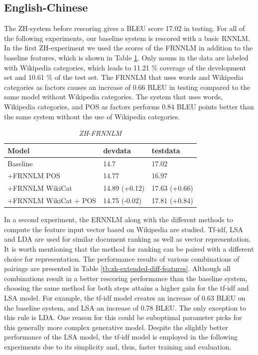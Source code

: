 \documentclass[a4paper]{article}
\begin{document}
\subsection{English-Chinese}
The ZH-system before rescoring gives a BLEU score 17.02 in testing. For all of the following experiments, our baseline system is rescored with a basic RNNLM.
In the first ZH-experiment we used the scores of the FRNNLM in addition to the baseline features, which is shown in Table \ref{tb:zh-factored}. Only nouns in the data are labeled with Wikipedia categories, which leads to 11.21 \% coverage of the development set and 10.61 \% of the test set. The FRNNLM that uses words and Wikipedia categories as factors causes an increase of 0.66 BLEU in testing compared to the same model without Wikipedia categories. The system that uses words, Wikipedia categories, and POS as factors performs 0.84 BLEU points better than the same system without the use of Wikipedia categories.

\begin{table}
\caption{\it ZH-FRNNLM}
\vspace{2mm}
\centering
  \begin{tabular}{ lll }
  	\hline
  	Model                 & devdata       & testdata      \\ \hline\hline
  	Baseline              & 14.7          & 17.02         \\
  	+FRNNLM POS           & 14.77         & 16.97         \\ \hline
  	+FRNNLM WikiCat       & 14.89 (+0.12) & 17.63 (+0.66) \\
  	+FRNNLM WikiCat + POS & 14.75 (-0.02) & 17.81 (+0.84) \\ \hline
  \end{tabular}
  \label{tb:zh-factored}
\end{table}

In a second experiment, the ERNNLM along with the different methods to compute the feature input vector based on Wikipedia are studied. Tf-idf, LSA and LDA are used for similar document ranking as well as vector representation. It is worth mentioning that the method for ranking can be paired with a different choice for representation. The performance results of various combinations of pairings are presented in Table \ref{tb:zh-extended-diff-features}. Although all combinations result in a better rescoring performance than the baseline system, choosing the same method for both steps attains a higher gain for the tf-idf and LSA model. For example, the tf-idf model creates an increase of 0.63 BLEU on the baseline system, and LSA an increase of 0.78 BLEU. The only exception to this rule is LDA. One reason for this could be suboptimal parameter picks for this generally more complex generative model. Despite the slightly better performance of the LSA model, the tf-idf model is employed in the following experiments due to its simplicity and, thus, faster training and evaluation.
\end{document}
